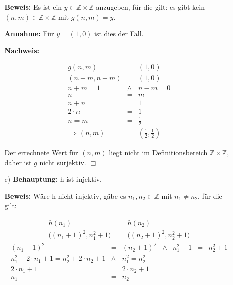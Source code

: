 \documentclass[a4paper]{scrartcl}
\begin{document}
\begin{enumerate}
\begin{enumerate}
                \textbf{Beweis:} Es ist ein $y \in \mathbb{Z} \times \mathbb{Z}$ anzugeben, für die gilt: es gibt 
                kein $(n, m) \in \mathbb{Z} \times \mathbb{Z}$ mit $g(n, m) = y$.
                
                \textbf{Annahme:} Für $y = (1, 0)$ ist dies der Fall.
                
                \textbf{Nachweis:}
                
                $$\begin{array}{rcl}
                    g(n, m) &=& (1, 0)\\
                    (n + m, n - m) &=& (1, 0)\\
                    n + m = 1 & \wedge & n - m = 0\\
                    n &=& m\\
                    n + n &=& 1\\
                    2 \cdot n &=& 1\\
                    n = m &=& \frac{1}{2}\\
                    \Rightarrow (n, m) &=& (\frac{1}{2}, \frac{1}{2})
                \end{array}$$
                
                Der errechnete Wert für $(n, m)$ liegt nicht im Definitionsbereich $\mathbb{Z} \times \mathbb{Z}$, 
                daher ist $g$ nicht surjektiv. $\Box$
            \item[c)]
                \textbf{Behauptung:} h ist injektiv.

                \textbf{Beweis:} Wäre h nicht injektiv, gäbe es $n_1, n_2 \in \mathbb{Z}$ mit $n_1 \not= n_2$, für die gilt:
                
                $$\begin{array}{rcl}
                    h(n_1) &=& h(n_2)\\
                    \big((n_1 + 1)^2, n_1^2 + 1\big) &=& \big((n_2 + 1)^2, n_2^2 + 1\big)
                \end{array}$$
                $$\begin{array}{rclcrcl}
                    (n_1 + 1)^2 &=& (n_2 + 1)^2 &\wedge& n_1^2 + 1 &=& n_2^2 + 1\\
                    n_1^2 + 2 \cdot n_1 + 1 = n_2^2 + 2 \cdot n_2 + 1 &\wedge& n_1^2 = n_2^2\\
                    2 \cdot n_1 + 1 &=& 2 \cdot n_2 + 1\\
                    n_1 &=& n_2
                \end{array}$$


\end{enumerate}
\end{enumerate}
\end{document}
